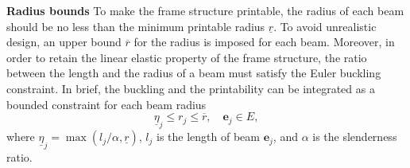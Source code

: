 \noindent\textbf{Radius bounds}
To make the frame structure printable, the radius of each beam should be no less than the minimum printable radius $\underline{r}$.
To avoid unrealistic design, an upper bound $\overline{r}$ for the radius is imposed for each beam.
Moreover, in order to retain the linear elastic property of the frame structure, the ratio between the length and the radius of a beam must satisfy the Euler buckling constraint.
%
In brief, the buckling and the printability can be integrated as a bounded constraint for each beam radius
\begin{equation} \label{eq:radius-bounds}
\underline{\eta}_j \leqslant {r}_j \leqslant \overline{r}, \quad  \mathbf{e}_j\in E,
\end{equation}
where $\underline{\eta}_j=\max(l_j/\alpha, \underline{r})$, $l_j$ is the length of beam $\mathbf{e}_j$, and $\alpha$ is the slenderness ratio.



